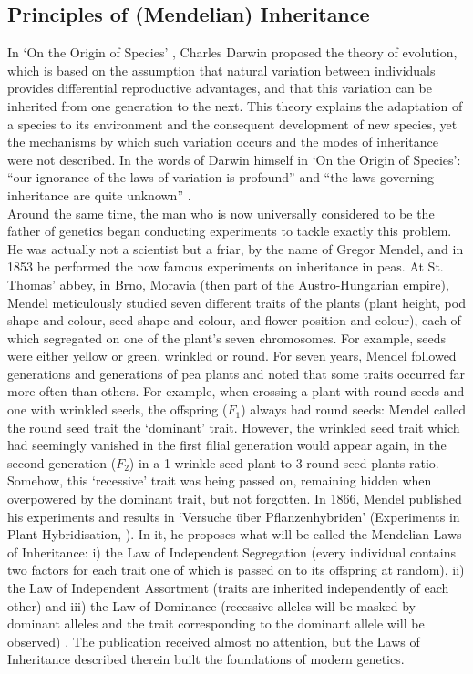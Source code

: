 \subsection{Principles of (Mendelian) Inheritance} %
\label{sec:Mendel}

In `On the Origin of Species' \cite{darwin1859origin}, Charles Darwin proposed the theory of evolution, which is based on the assumption that natural variation between individuals provides differential reproductive advantages, and that this variation can be inherited from one generation to the next. 
This theory explains the adaptation of a species to its environment and the consequent development of new species, yet the mechanisms by which such variation occurs and the modes of inheritance were not described. 
In the words of Darwin himself in `On the Origin of Species': “our ignorance of the laws of variation is profound” and “the laws governing inheritance are quite unknown” \cite{darwin1859origin}.\\

Around the same time, the man who is now universally considered to be the father of genetics began conducting experiments to tackle exactly this problem. 
He was actually not a scientist but a friar, by the name of Gregor Mendel, and in 1853 he performed the now famous experiments on inheritance in peas. 
At St. Thomas' abbey, in Brno, Moravia (then part of the Austro-Hungarian empire), Mendel meticulously studied seven different traits of the plants (plant height, pod shape and colour, seed shape and colour, and flower position and colour), each of which segregated on one of the plant's seven chromosomes. 
For example, seeds were either yellow or green, wrinkled or round. For seven years, Mendel followed generations and generations of pea plants and noted that some traits occurred far more often than others. 
For example, when crossing a plant with round seeds and one with wrinkled seeds, the offspring ($F_1$) always had round seeds: Mendel called the round seed trait the `dominant' trait. 
However, the wrinkled seed trait which had seemingly vanished in the first filial generation would appear again, in the second generation ($F_2$) in a 1 wrinkle seed plant to 3 round seed plants ratio. 
Somehow, this `recessive' trait was being passed on, remaining hidden when overpowered by the dominant trait, but not forgotten. 
In 1866, Mendel published his experiments and results in `Versuche über Pflanzenhybriden' (Experiments in Plant Hybridisation, \cite{mendel1996experiments}). 
In it, he proposes what will be called the Mendelian Laws of Inheritance: i) the Law of Independent Segregation (every individual contains two factors for each trait one of which is passed on to its offspring at random), ii) the Law of Independent Assortment (traits are inherited independently of each other) and iii) the Law of Dominance (recessive alleles will be masked by dominant alleles and the trait corresponding to the dominant allele will be observed) \cite{mendel1996experiments}. 
The publication received almost no attention, but the Laws of Inheritance described therein built the foundations of modern genetics.\\


